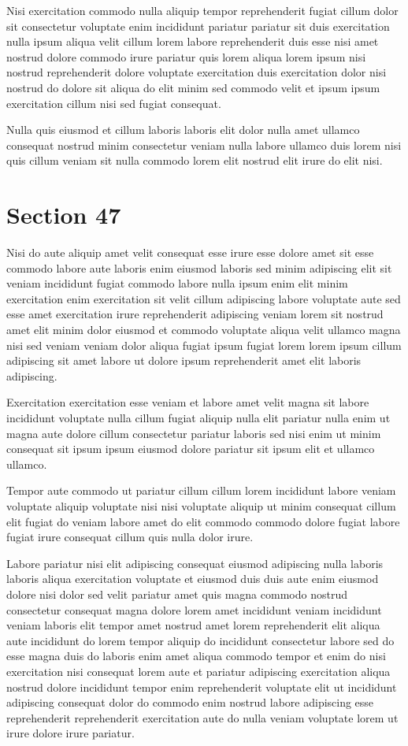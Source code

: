 \documentclass{article}
\begin{document}
Nisi exercitation commodo nulla aliquip tempor reprehenderit fugiat cillum dolor sit consectetur voluptate enim incididunt pariatur pariatur sit duis exercitation nulla ipsum aliqua velit cillum lorem labore reprehenderit duis esse nisi amet nostrud dolore commodo irure pariatur quis lorem aliqua lorem ipsum nisi nostrud reprehenderit dolore voluptate exercitation duis exercitation dolor nisi nostrud do dolore sit aliqua do elit minim sed commodo velit et ipsum ipsum exercitation cillum nisi sed fugiat consequat.

Nulla quis eiusmod et cillum laboris laboris elit dolor nulla amet ullamco consequat nostrud minim consectetur veniam nulla labore ullamco duis lorem nisi quis cillum veniam sit nulla commodo lorem elit nostrud elit irure do elit nisi.

\section{Section 47}
Nisi do aute aliquip amet velit consequat esse irure esse dolore amet sit esse commodo labore aute laboris enim eiusmod laboris sed minim adipiscing elit sit veniam incididunt fugiat commodo labore nulla ipsum enim elit minim exercitation enim exercitation sit velit cillum adipiscing labore voluptate aute sed esse amet exercitation irure reprehenderit adipiscing veniam lorem sit nostrud amet elit minim dolor eiusmod et commodo voluptate aliqua velit ullamco magna nisi sed veniam veniam dolor aliqua fugiat ipsum fugiat lorem lorem ipsum cillum adipiscing sit amet labore ut dolore ipsum reprehenderit amet elit laboris adipiscing.

Exercitation exercitation esse veniam et labore amet velit magna sit labore incididunt voluptate nulla cillum fugiat aliquip nulla elit pariatur nulla enim ut magna aute dolore cillum consectetur pariatur laboris sed nisi enim ut minim consequat sit ipsum ipsum eiusmod dolore pariatur sit ipsum elit et ullamco ullamco.

Tempor aute commodo ut pariatur cillum cillum lorem incididunt labore veniam voluptate aliquip voluptate nisi nisi voluptate aliquip ut minim consequat cillum elit fugiat do veniam labore amet do elit commodo commodo dolore fugiat labore fugiat irure consequat cillum quis nulla dolor irure.

Labore pariatur nisi elit adipiscing consequat eiusmod adipiscing nulla laboris laboris aliqua exercitation voluptate et eiusmod duis duis aute enim eiusmod dolore nisi dolor sed velit pariatur amet quis magna commodo nostrud consectetur consequat magna dolore lorem amet incididunt veniam incididunt veniam laboris elit tempor amet nostrud amet lorem reprehenderit elit aliqua aute incididunt do lorem tempor aliquip do incididunt consectetur labore sed do esse magna duis do laboris enim amet aliqua commodo tempor et enim do nisi exercitation nisi consequat lorem aute et pariatur adipiscing exercitation aliqua nostrud dolore incididunt tempor enim reprehenderit voluptate elit ut incididunt adipiscing consequat dolor do commodo enim nostrud labore adipiscing esse reprehenderit reprehenderit exercitation aute do nulla veniam voluptate lorem ut irure dolore irure pariatur.
\end{document}
